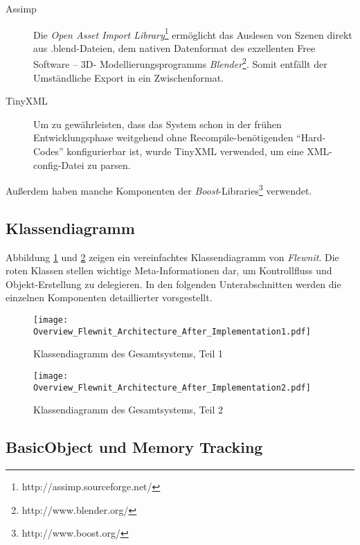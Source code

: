 \begin{description}
       		
       		
    	\item[Assimp]
    	Die \emph{Open Asset Import Library}\footnote{http://assimp.sourceforge.net/} ermöglicht das Auslesen
    	von Szenen direkt aus .blend-Dateien, dem nativen Datenformat des exzellenten Free Software -- 3D-
    	Modellierungsprogramms \emph{Blender}\footnote{http://www.blender.org/}.
    	Somit entfällt der Umständliche Export in ein Zwischenformat.

    	
   		\item[TinyXML]
   		Um zu gewährleisten, dass das System schon in der frühen Entwicklungsphase weitgehend ohne 
   		Recompile-benötigenden "`Hard-Codes"' konfigurierbar ist, wurde TinyXML verwended, um eine XML-
   		config-Datei zu parsen.    	
    
	
	\end{description}	

	Außerdem haben manche Komponenten der \emph{Boost}-Libraries\footnote{http://www.boost.org/} verwendet.
	
	


\subsection{Klassendiagramm}
Abbildung \ref{fig:ClassDiagOverview1} und \ref{fig:ClassDiagOverview2} zeigen ein vereinfachtes Klassendiagramm
von \emph{Flewnit}. Die roten Klassen stellen wichtige Meta-Informationen dar, um Kontrollfluss und Objekt-Erstellung
zu delegieren. In den folgenden Unterabschnitten werden die einzelnen Komponenten detaillierter vorsgestellt.

\begin{figure}[!h]
	 \texttt{[image: Overview\_Flewnit\_Architecture\_After\_Implementation1.pdf]}
	\caption{Klassendiagramm des Gesamtsystems, Teil 1}
	\label{fig:ClassDiagOverview1}
\end{figure}


\begin{figure}[!h]
	 \texttt{[image: Overview\_Flewnit\_Architecture\_After\_Implementation2.pdf]}
	\caption{Klassendiagramm des Gesamtsystems, Teil 2}
	\label{fig:ClassDiagOverview2}
\end{figure}



 
\subsection{BasicObject und Memory Tracking}
	\lstset{language=C++} %
	
